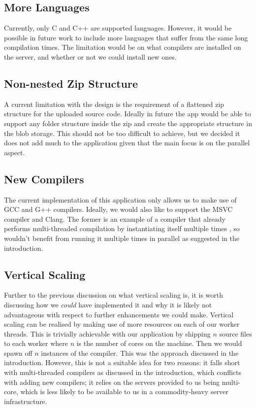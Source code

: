 \documentclass[conference]{IEEEtran}
\begin{document}
\subsection{More Languages}
Currently, only C and C++ are supported languages. However, it would be possible
in future work to include more languages that suffer from the same long
compilation times. The limitation would be on what compilers are installed on
the server, and whether or not we could install new ones.
\subsection{Non-nested Zip Structure}
A current limitation with the design is the requirement of a flattened zip
structure for the uploaded source code. Ideally in future the app would be able
to support any folder structure inside the zip and create the appropriate
structure in the blob storage. This should not be too difficult to achieve, but
we decided it does not add much to the application given that the main focus is
on the parallel aspect.
\subsection{New Compilers}
The current implementation of this application only allows us to make use of GCC
and G++ compilers. Ideally, we would also like to support the MSVC compiler and
Clang. The former is an example of a compiler that already performs
multi-threaded compilation by instantiating itself multiple times \cite{MSVC},
so wouldn't benefit from running it multiple times in parallel as suggested in
the introduction.
\subsection{Vertical Scaling}
Further to the previous discussion on what vertical scaling is, it is worth
discussing how we \emph{could} have implemented it and why it is likely not
advantageous with respect to further enhancements we could make. Vertical
scaling can be realised by making use of more resources on each of our worker
threads. This is trivially achievable with our application by shipping $n$
source files to each worker where $n$ is the number of cores on the machine.
Then we would spawn off $n$ instances of the compiler. This was the approach
discussed in the introduction. However, this is not a suitable idea for two
reasons: it falls short with multi-threaded compilers as
discussed in the introduction, which conflicts with adding new compilers; it
relies on the servers provided to us being multi-core, which is less likely to
be available to us in a commodity-heavy server infrastructure.
\end{document}
